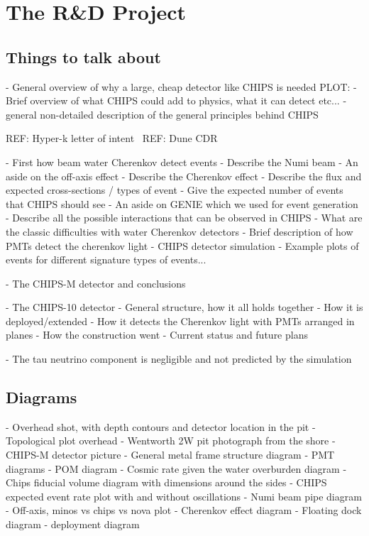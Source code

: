\chapter{The \chips R\&D Project}
\label{chap:chips}

\section{Things to talk about}

- General overview of why a large, cheap detector like CHIPS is needed
PLOT:
- Brief overview of what CHIPS could add to physics, what it can detect etc...
- general non-detailed description of the general principles behind CHIPS

REF: Hyper-k letter of intent~\cite{abe2011}
REF: Dune CDR~\cite{acciarri2016}

- First how beam water Cherenkov detect events
- Describe the Numi beam
- An aside on the off-axis effect
- Describe the Cherenkov effect
- Describe the flux and expected cross-sections / types of event
- Give the expected number of events that CHIPS should see
- An aside on GENIE which we used for event generation
- Describe all the possible interactions that can be observed in CHIPS
- What are the classic difficulties with water Cherenkov detectors
- Brief description of how PMTs detect the cherenkov light
- CHIPS detector simulation
- Example plots of events for different signature types of events...

- The CHIPS-M detector and conclusions

- The CHIPS-10 detector
- General structure, how it all holds together
- How it is deployed/extended
- How it detects the Cherenkov light with PMTs arranged in planes
- How the construction went
- Current status and future plans

- The tau neutrino component is negligible and not predicted by the simulation

\section{Diagrams}

- Overhead shot, with depth contours and detector location in the pit
- Topological plot overhead
- Wentworth 2W pit photograph from the shore
- CHIPS-M detector picture
- General metal frame structure diagram
- PMT diagrams
- POM diagram
- Cosmic rate given the water overburden diagram
- Chips fiducial volume diagram with dimensions around the sides
- CHIPS expected event rate plot with and without oscillations
- Numi beam pipe diagram
- Off-axis, minos vs chips vs nova plot
- Cherenkov effect diagram
- Floating dock diagram
- deployment diagram


